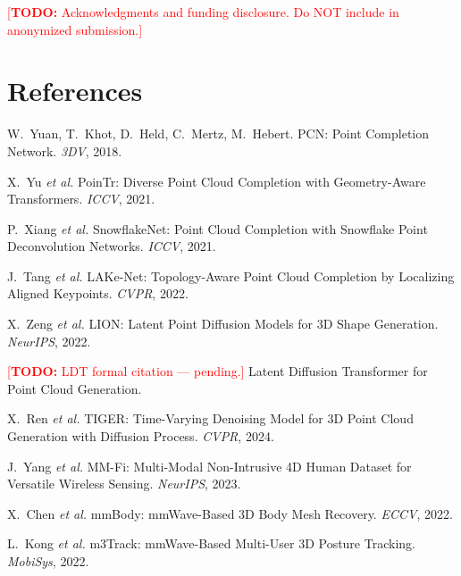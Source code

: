 \documentclass{article}
\newcommand{\todo}[1]{\textcolor{red}{[\textbf{TODO:} #1]}}
\begin{document}
\begin{ack}
\todo{Acknowledgments and funding disclosure. Do NOT include in anonymized submission.}
\end{ack}

\section*{References}
{\small
\begin{enumerate}[label={[\arabic*]},leftmargin=2em,itemsep=2pt]
  \item\label{ref:pcn}
        W.\ Yuan, T.\ Khot, D.\ Held, C.\ Mertz, M.\ Hebert.
        PCN: Point Completion Network. \emph{3DV}, 2018.
  \item\label{ref:pointr}
        X.\ Yu \emph{et al.}
        PoinTr: Diverse Point Cloud Completion with Geometry-Aware Transformers.
        \emph{ICCV}, 2021.
  \item\label{ref:snowflake}
        P.\ Xiang \emph{et al.}
        SnowflakeNet: Point Cloud Completion with Snowflake Point Deconvolution
        Networks. \emph{ICCV}, 2021.
  \item\label{ref:lakenet}
        J.\ Tang \emph{et al.}
        LAKe-Net: Topology-Aware Point Cloud Completion by Localizing Aligned
        Keypoints. \emph{CVPR}, 2022.
  \item\label{ref:lion}
        X.\ Zeng \emph{et al.}
        LION: Latent Point Diffusion Models for 3D Shape Generation.
        \emph{NeurIPS}, 2022.
  \item\label{ref:ldt}
        \todo{LDT formal citation — pending.}
        Latent Diffusion Transformer for Point Cloud Generation.
  \item\label{ref:tiger}
        X.\ Ren \emph{et al.}
        TIGER: Time-Varying Denoising Model for 3D Point Cloud Generation with
        Diffusion Process. \emph{CVPR}, 2024.
  \item\label{ref:mmfi}
        J.\ Yang \emph{et al.}
        MM-Fi: Multi-Modal Non-Intrusive 4D Human Dataset for Versatile Wireless
        Sensing. \emph{NeurIPS}, 2023.
  \item\label{ref:mmbody}
        X.\ Chen \emph{et al.}
        mmBody: mmWave-Based 3D Body Mesh Recovery. \emph{ECCV}, 2022.
  \item\label{ref:radarhd}
        L.\ Kong \emph{et al.}
        m3Track: mmWave-Based Multi-User 3D Posture Tracking.
        \emph{MobiSys}, 2022.
\end{enumerate}
}
\end{document}
